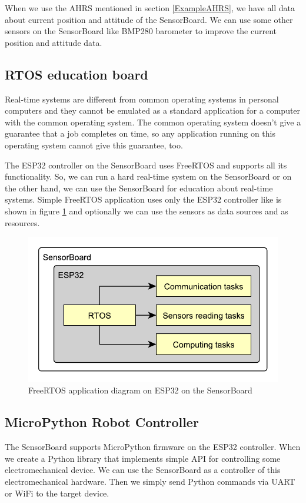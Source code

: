 When we use the \ac{AHRS} mentioned in section \ref{ExampleAHRS}, we have all data about current position and attitude of the SensorBoard. We can use some other sensors on the SensorBoard like BMP280 barometer \cite{bosch:BMP280} to improve the current position and attitude data.

\subsection{RTOS education board}
Real-time systems are different from common operating systems in personal computers and they cannot be emulated as a standard application for a computer with the common operating system. The common operating system doesn't give a guarantee that a job completes on time, so any application running on this operating system cannot give this guarantee, too.

The ESP32 controller on the SensorBoard uses FreeRTOS and supports all its functionality. \cite{ESP32FreeRTOS} So, we can run a hard real-time system on the SensorBoard or on the other hand, we can use the SensorBoard for education about real-time systems. Simple FreeRTOS application uses only the ESP32 controller like is shown in figure \ref{UEFreeRTOS} and optionally we can use the sensors as data sources and as resources.

\begin{figure}
    \centering
    \label{UEFreeRTOS}
    \caption{FreeRTOS application diagram on ESP32 on the SensorBoard}
    \includegraphics[scale=1]{img/UsageExamplesRTOS.pdf}
\end{figure}

\subsection{MicroPython Robot Controller}
The SensorBoard supports MicroPython firmware \cite{MicroPython} on the ESP32 controller. When we create a Python library that implements simple \ac{API} for controlling some electromechanical device. We can use the SensorBoard as a controller of this electromechanical hardware. Then we simply send Python commands via UART or WiFi to the target device.

